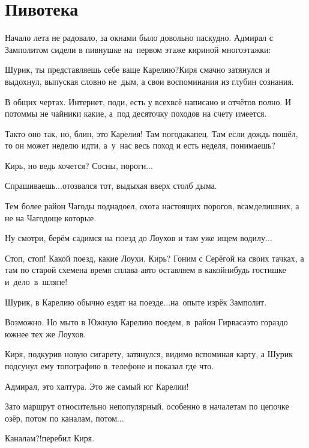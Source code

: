 \chapter{Пивотека}
\vepsianrose

Начало лета не радовало, за окнами было довольно паскудно. Адмирал с Замполитом сидели в пивнушке на~первом этаже кириной многоэтажки:

\diagdash Шурик, ты представляешь себе ваще Карелию?\mdash Киря смачно затянулся и выдохнул, выпуская словно не~дым, а свои воспоминания из глубин сознания.

\diagdash В общих чертах. Интернет, поди, есть у всех\mdash всё написано и отчётов полно. И потом\mdash мы не чайники какие, а~под десяточку походов на счету имеется. %

\diagdash Так\sdash то оно так, но, блин, это Карелия! Там погода\mdash капец. Там если дождь пошёл, то он может неделю идти, а~у~нас весь поход и есть неделя, понимаешь?

\diagdash Кирь, но ведь хочется? Сосны, пороги$\ldots$

\diagdash Спрашиваешь$\ldots$\mdash отозвался тот, выдыхая вверх столб дыма.

\diagdash Тем более район Чагоды поднадоел, охота настоящих порогов, всамделишних, а не на Чагодоще которые.

\diagdash Ну смотри, берём садимся на поезд до Лоухов и там уже ищем водилу$\ldots$

\diagdash Стоп, стоп! Какой поезд, какие Лоухи, Кирь? Гоним с Серёгой на своих тачках, а там по старой схеме\mdash на время сплава авто оставляем в какой\sdash нибудь гостишке и~дело~в~шляпе!

\diagdash Шурик, в Карелию обычно ездят на поезде$\ldots$\mdash на~опыте изрёк Замполит.

\diagdash Возможно. Но мы\sdash то в Южную Карелию поедем, в~район Гирваса\mdash это гораздо южнее тех же Лоухов.

Киря, подкурив новую сигарету, затянулся, видимо вспоминая карту, а Шурик подсунул ему топографию в~телефоне и показал где что.

\diagdash Адмирал, это халтура. Это же самый юг Карелии!

\diagdash Зато маршрут относительно непопулярный, особенно в начале\mdash там по цепочке озёр, потом по каналам, потом$\ldots$

\diagdash Каналам?!\mdash перебил Киря.

